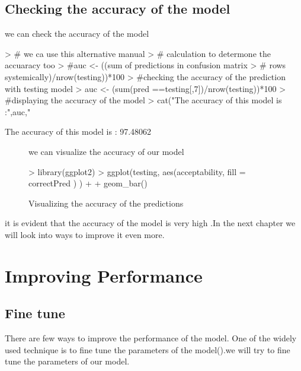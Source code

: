 \documentclass{article}
\begin{document}
\subsection{Checking the accuracy of the model}
we can check the accuracy of the model
\begin{Schunk}
\begin{Sinput}
> # we ca use this alternative manual 
> #             calculation to determone the accuaracy too
> #auc <- ((sum of predictions in confusion matrix 
> #                 rows systemically)/nrow(testing))*100
> #checking the accuracy of the prediction with testing model
> auc <- (sum(pred ==testing[,7])/nrow(testing))*100
> #displaying the accuracy of the model
> cat("The accuracy of this model is :",auc,"%")
\end{Sinput}
\begin{Soutput}
The accuracy of this model is : 97.48062 %
\end{Soutput}
\end{Schunk}
\begin{figure}
we can visualize the accuracy of our model
\begin{Schunk}
\begin{Sinput}
> library(ggplot2)
> ggplot(testing, aes(acceptability, fill = correctPred ) ) +
+   geom_bar()
\end{Sinput}
\end{Schunk}
\caption{Visualizing the accuracy of the predictions}
\end{figure}
it is evident that the accuracy of the model is very high .In the next chapter we will look into ways to improve it even more.
\newpage
\section{Improving Performance}
\subsection{Fine tune}
There are few ways to improve the performance of the model. One of the widely used technique is to fine tune the parameters of the model(\textcite{Tavish}).we will try to fine tune the parameters of our model.
\break
\end{document}
